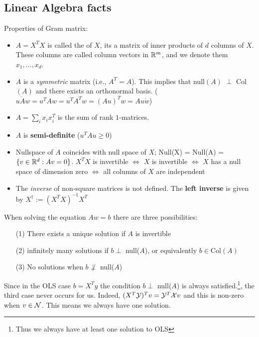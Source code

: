 \subsection{Linear Algebra facts}
Properties of Gram matrix:
\begin{itemize}
    \item $A = X^T X$ is called the  of $X$, its a matrix of inner products of $d$ columns of $X$. These columns are called column vectors in $\mathbb R^m$, and we denote them $x_1, \dots, x_d$.
    \item $A$ is a \textit{symmetric} matrix (i.e., $A^T = A$). This implies that null$(A)$ $\perp$ Col$(A)$ and there exists an orthonormal basis. ($u \dot Aw = u^T Aw = u^TA^Tw = (Au)^Tw = Au \dot w$)
    \item $A = \sum_{i}x_ix_{i}^T$ is the sum of rank $1$-matrices.
    \item $A$ is \textbf{semi-definite} ($u^TAu \geq 0$)
    \item Nullspace of $A$ coincides with null space of $X$; Null(X) = Null(A) = $\{v \in \mathbb R^d : Av =0\}$. $X^T X$ is invertible $\iff$ $X$ is invertible $\iff$ $X$ has a null space of dimension zero $\iff$ all columns of $X$ are independent
    \item The \textit{inverse} of non-square matrices is not defined. The \textbf{left inverse} is given by $X^{\dag} := (X^TX)^{-1}X^T $
\end{itemize}
When solving the equation $Aw =b$ there are three possibilities:
\begin{enumerate}
    \item [(1)] There exists a unique solution if $A$ is invertible
    \item [(2)] infinitely many solutions if $b \perp$ null($A$), or equivalently $b \in \text{Col}(A)$ 
    \item [(3)] No solutions when $b \not\perp$ null($A$)
\end{enumerate}
Since in the OLS case $b = X^Ty$ the condition $b \perp$ null($A$) is always satisfied.\footnote{Thus we always have at least one solution to OLS}, the third case never occurs for us. Indeed, $(X^T\mathcal Y)^T v = \mathcal Y^T \mathcal X v$ and this is non-zero when $v \in \mathcal N$. This means we always have one solution.

